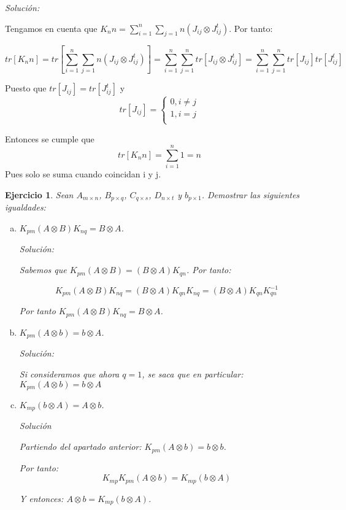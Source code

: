 \documentclass{article}
\theoremstyle{theorem-style}  %
\theoremstyle{definition-style}
\theoremstyle{example-style}
\theoremstyle{exercise-style}
\newtheorem{exercise}{Ejercicio}[section]
\begin{document}
	\textit{Solución:}
	
	Tengamos en cuenta que $K_nn = \sum_{i=1}^{n}\sum_{j=1} {n} (J_{ij} \otimes J_{ij}^t)$. Por tanto:
	
	$$tr[K_nn] = tr[\sum_{i=1}^{n}\sum_{j=1} {n} (J_{ij} \otimes J_{ij}^t)] = \sum_{i=1}^{n}\sum_{j=1}^{n} tr[J_{ij} \otimes J_{ij}^t] = \sum_{i=1}^{n}\sum_{j=1}^{n} tr[J_{ij}]tr[J_{ij}^t]$$
	
	Puesto que $tr[J_{ij}]=tr[J_{ij}^t]$ y 
	$$ tr[J_{ij}] = \begin{cases}
	0, i \ne j\\
	1, i = j\\
	\end{cases}$$ 
	
	Entonces se cumple que $$tr[K_nn] = \sum_{i=1}^{n} 1 = n$$
	Pues solo se suma cuando coincidan i y j.
	
	\begin{exercise}
		Sean $A_{m\times n}$, $B_{p\times q}$, $C_{q\times s}$, $D_{n\times t}$ y $b_{p\times 1}$. Demostrar las siguientes igualdades:
		\begin{enumerate}[a)]
			\item $K_{pm}(A \otimes B)K_{nq} = B\otimes A$.
			
			\textit{Solución:}
			
			Sabemos que $K_{pm}(A \otimes B) = (B\otimes A)K_{qn}$. Por tanto:
			
			$$K_{pm}(A \otimes B)K_{nq} = (B \otimes A)K_{qn}K_{nq} = (B \otimes A)K_{qn}K_{qn}^{-1}$$
			
			Por tanto $K_{pm}(A \otimes B) K_{nq} = B\otimes A$.
			
			\item $K_{pm}(A \otimes b) = b\otimes A$.
			
			\textit{Solución:}
			
			Si consideramos que ahora $q=1$, se saca que en particular: $K_{pm}(A \otimes b) = b\otimes A$
			
			
			\item $K_{mp}(b \otimes A) = A\otimes b$.
			
			\textit{Solución}
			
			Partiendo del apartado anterior: $K_{pm}(A\otimes b) = b \otimes b$.
			
			Por tanto: $$K_{mp}K_{pm}(A\otimes b) = K_{mp}(b\otimes A)$$
			
			Y entonces: $A \otimes b = K_{mp}(b \otimes A)$. 
		\end{enumerate}
	\end{exercise}
	
\end{document}
